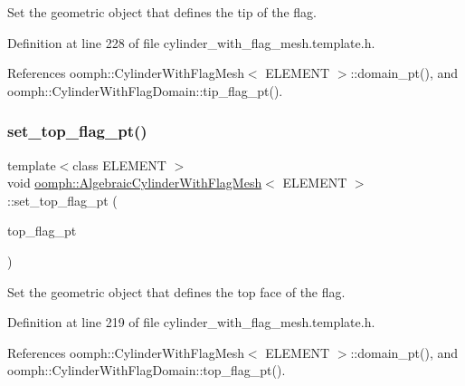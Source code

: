 Set the geometric object that defines the tip of the flag. 



Definition at line 228 of file cylinder\+\_\+with\+\_\+flag\+\_\+mesh.\+template.\+h.



References oomph\+::\+Cylinder\+With\+Flag\+Mesh$<$ E\+L\+E\+M\+E\+N\+T $>$\+::domain\+\_\+pt(), and oomph\+::\+Cylinder\+With\+Flag\+Domain\+::tip\+\_\+flag\+\_\+pt().

\mbox{\label{classoomph_1_1AlgebraicCylinderWithFlagMesh_a9d7f04acdaed3e9f2133d9665dd4b799}} 
\subsubsection{\texorpdfstring{set\+\_\+top\+\_\+flag\+\_\+pt()}{set\_top\_flag\_pt()}}
{\footnotesize\ttfamily template$<$class E\+L\+E\+M\+E\+NT $>$ \\
void \hyperlink{classoomph_1_1AlgebraicCylinderWithFlagMesh}{oomph\+::\+Algebraic\+Cylinder\+With\+Flag\+Mesh}$<$ E\+L\+E\+M\+E\+NT $>$\+::set\+\_\+top\+\_\+flag\+\_\+pt (\begin{DoxyParamCaption}\item[{Geom\+Object $\ast$}]{top\+\_\+flag\+\_\+pt }\end{DoxyParamCaption})\hspace{0.3cm}{\ttfamily [inline]}}



Set the geometric object that defines the top face of the flag. 



Definition at line 219 of file cylinder\+\_\+with\+\_\+flag\+\_\+mesh.\+template.\+h.



References oomph\+::\+Cylinder\+With\+Flag\+Mesh$<$ E\+L\+E\+M\+E\+N\+T $>$\+::domain\+\_\+pt(), and oomph\+::\+Cylinder\+With\+Flag\+Domain\+::top\+\_\+flag\+\_\+pt().

\mbox{\label{classoomph_1_1AlgebraicCylinderWithFlagMesh_ad6af2e420e0f152a7fb055f25400a5d0}} 
